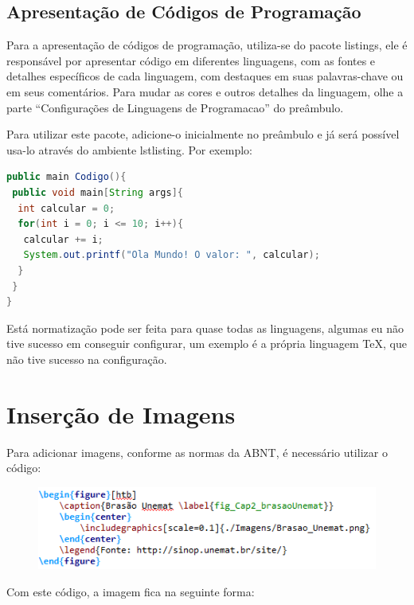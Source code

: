 \subsection{Apresentação de Códigos de Programação}
Para a apresentação de códigos de programação, utiliza-se do pacote listings, ele é responsável por apresentar código em diferentes linguagens, com as fontes e detalhes específicos de cada linguagem, com destaques em suas palavras-chave ou em seus comentários. Para mudar as cores e outros detalhes da linguagem, olhe a parte ``Configurações de Linguagens de Programacao'' do preâmbulo.

Para utilizar este pacote, adicione-o inicialmente no preâmbulo e já será possível usa-lo através do ambiente lstlisting. Por exemplo:
\begin{lstlisting}[language = Java]
public main Codigo(){
 public void main[String args]{
  int calcular = 0;
  for(int i = 0; i <= 10; i++){
   calcular += i;
   System.out.printf("Ola Mundo! O valor: ", calcular);
  }
 }
}
\end{lstlisting}

Está normatização pode ser feita para quase todas as linguagens, algumas eu não tive sucesso em conseguir configurar, um exemplo é a própria linguagem TeX, que não tive sucesso na configuração. 
\section{Inserção de Imagens}
Para adicionar imagens, conforme as normas da ABNT, é necessário utilizar o código:

\begin{figure}[htb]
	\begin{center}
		\includegraphics[scale=1]{./Imagens/capitulo_2/code_5.png}
	\end{center}
\end{figure}

Com este código, a imagem fica na seguinte forma:

